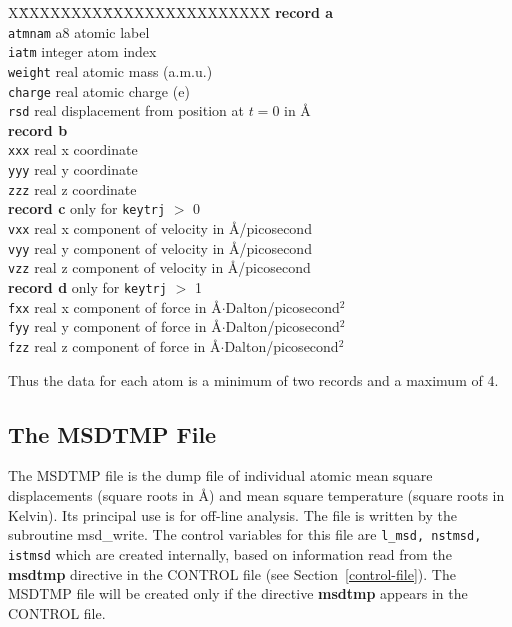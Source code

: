\begin{tabbing}
X\=XXXXXXXX\=XXXXXXXXXXXXXXXX\=\kill
{\bf record a} \\
\> {\tt atmnam} \> a8      \> atomic label \\
\> {\tt iatm}   \> integer \> atom index \\
\> {\tt weight} \> real    \> atomic mass (a.m.u.) \\
\> {\tt charge} \> real    \> atomic charge (e) \\
\> {\tt rsd}    \> real    \> displacement from position at $t=0$ in \AA \\
{\bf record b} \\
\> {\tt xxx}    \> real    \> x coordinate \\
\> {\tt yyy}    \> real    \> y coordinate \\
\> {\tt zzz}    \> real    \> z coordinate \\
{\bf record c} only for {\tt keytrj} $>$ 0 \\
\> {\tt vxx}    \> real    \> x component of velocity in \AA/picosecond \\
\> {\tt vyy}    \> real    \> y component of velocity in \AA/picosecond \\
\> {\tt vzz}    \> real    \> z component of velocity in \AA/picosecond \\
{\bf record d} only for {\tt keytrj} $>$ 1 \\
\> {\tt fxx}    \> real    \> x component of force in \AA$\cdot$Dalton/picosecond$^{2}$ \\
\> {\tt fyy}    \> real    \> y component of force in \AA$\cdot$Dalton/picosecond$^{2}$ \\
\> {\tt fzz}    \> real    \> z component of force in \AA$\cdot$Dalton/picosecond$^{2}$
\end{tabbing}
Thus the data for each atom is a minimum of two records and a maximum of 4.

\subsection{The MSDTMP File}
\label{msdtmp-file}

The MSDTMP file is the dump file of individual atomic mean square
displacements (square roots in \AA) and mean square temperature
(square roots in Kelvin).  Its principal use is for off-line analysis.
The file is written by the subroutine {\sc msd\_write}.  The control
variables for this file are {\tt l\_msd, nstmsd, istmsd} which are
created internally, based on information read from the {\bf msdtmp}
directive in the CONTROL file (see Section~\ref{control-file}).
The MSDTMP file will be created only if the directive {\bf msdtmp}
appears in the CONTROL file.

